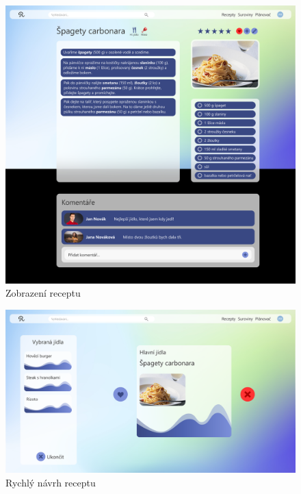 \begin{figure}[h]
    \includegraphics[width=\textwidth]{pdf/adobexd/zobrazeni-receptu}
    \caption{Zobrazení receptu} \label{picture:recipeo:zobrazeni-receptu}
\end{figure}

\begin{figure}[h]
    \includegraphics[width=\textwidth]{pdf/adobexd/navrh-jidla}
    \caption{Rychlý návrh receptu} \label{picture:recipeo:rychly-navrh}
\end{figure}

